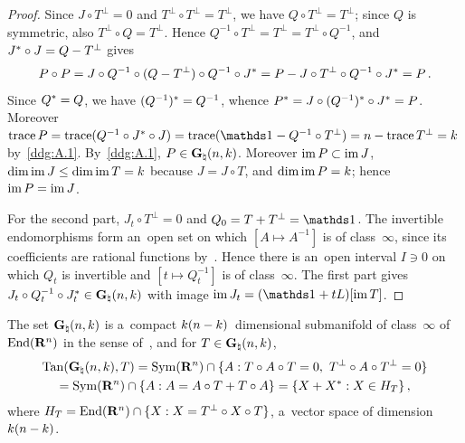 \documentclass[a4paper,twoside,leqno]{article}
\newcommand{\Gk}{\pgrass{\adim}{\vdim}}        %
\newcommand{\MS}{\textbf{[MS path]}}            %
\begin{document}
\begin{proof}
    Since $J \circ T^\perp = 0$ and $T^\perp \circ T^\perp = T^\perp$, we have $Q \circ T^\perp =
    T^\perp$; since $Q$ is symmetric, also $T^\perp \circ Q = T^\perp$. Hence $Q^{-1} \circ T^\perp =
    T^\perp = T^\perp \circ Q^{-1}$, and $J^{*} \circ J = Q - T^\perp$ gives
    \begin{displaymath}
        P \circ P = J \circ Q^{-1} \circ (Q - T^\perp) \circ Q^{-1} \circ J^{*} = P - J
        \circ T^\perp \circ Q^{-1} \circ J^{*} = P \,.
    \end{displaymath}
    Since $Q^{*} = Q$, we have $(Q^{-1})^{*} = Q^{-1}$, whence $P^{*} = J \circ (Q^{-1})^{*} \circ J^{*} = P$. Moreover $\trace P = \trace(Q^{-1} \circ \transpose{J} \circ J) =
    \trace(\id{} - Q^{-1} \circ T^\perp) = \adim - \trace T^\perp = \vdim$ by~\ref{ddg:A.1}.
    By~\ref{ddg:A.1}, $P \in \Gk$. Moreover $\operatorname{im} P \subset \operatorname{im} J$, $\dim \operatorname{im} J \le \dim \operatorname{im} T =
    k$ because $J = J \circ T$, and $\dim \operatorname{im} P = k$; hence $\operatorname{im} P = \operatorname{im} J$.

    For the second part, $J_t \circ T^\perp = 0$ and $Q_0 = T + T^\perp = \id{}$. The invertible
    endomorphisms form an~open set on which $[ A \mapsto A^{-1} ]$ is of class~$\infty$, since its
    coefficients are rational functions by~\cite[1.3.4]{Federer1969}. Hence there is an~open
    interval $I \ni 0$ on which $Q_t$ is invertible and $[ t \mapsto Q_t^{-1} ]$ is of
    class~$\infty$. The first part gives $J_t \circ Q_t^{-1} \circ \transpose{J_t} \in \Gk$ with
    image $\im J_t = (\id{} + tL)[\im T]$.
\end{proof}

\begin{lemma}[{\cite[(A.2) and p.~1143]{DePhilippis2018}; \MS}]
    \label{ddg:A.tan}
    The set $\Gk$ is a~compact $k(n - k)$~dimensional submanifold of class~$\infty$
    of~$\mathrm{End}({\mathbf{R}^{n}})$ in the sense of~\cite[3.1.19]{Federer1969}, and for $T \in \Gk$,
    \begin{multline*}
        \Tan(\Gk,T) = \SymEnd{\R^{\adim}} \cap \{ A : T \circ A \circ T = 0,\ T^\perp \circ A \circ
        T^\perp = 0 \} \\
        = \SymEnd{\R^{\adim}} \cap \{ A : A = A \circ T + T \circ A \} = \{ X + \transpose{X} : X \in
        H_T \} \,,
    \end{multline*}
    where $H_T = \mathrm{End}({\mathbf{R}^{n}}) \cap \{ X : X = T^\perp \circ X \circ T \}$, a~vector space of
    dimension $k(n - k)$.
\end{lemma}
\end{document}
